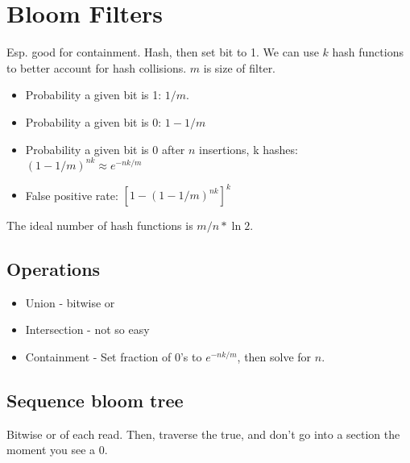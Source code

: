 \documentclass{article}
\begin{document}
\section*{Bloom Filters}
Esp. good for containment. Hash, then set bit to 1. We can use $k$ hash functions to better account for hash collisions. $m$ is size of filter.
\begin{itemize}
    \item Probability a given bit is 1: $1/m$.
    \item Probability a given bit is 0: $1-1/m$
    \item Probability a given bit is 0 after $n$ insertions, k hashes: $(1-1/m)^{nk}\approx e^{-nk/m}$
    \item False positive rate: $[1-(1-1/m)^{nk}]^{k}$
\end{itemize}{}
The ideal number of hash functions is $m/n*\ln 2$.
\subsection*{Operations}
\begin{itemize}
    \item Union - bitwise or
    \item Intersection - not so easy
    \item Containment - Set fraction of 0's to $e^{-nk/m}$, then solve for $n$.
\end{itemize}
\subsection*{Sequence bloom tree}
Bitwise or of each read. Then, traverse the true, and don't go into a section the moment you see a 0.
\end{document}
